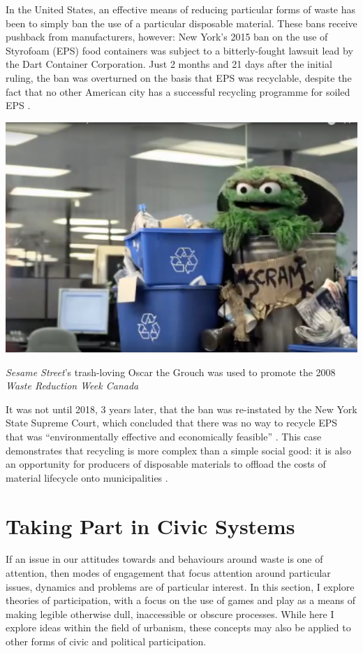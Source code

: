\documentclass[nofonts,nols,justified,nobib]{tufte-book}
\begin{document}
In the United States, an effective means of reducing particular forms of waste has been to simply ban the use of a particular disposable material. These bans receive pushback from manufacturers, however: New York's 2015 ban on the use of Styrofoam (EPS) food containers was subject to a bitterly-fought lawsuit lead by the Dart Container Corporation. Just 2 months and 21 days after the initial ruling, the ban was overturned on the basis that EPS was recyclable, despite the fact that no other American city has a successful recycling programme for soiled EPS \cite{liboiron_power_2015}. 
\begin{marginfigure}
\includegraphics[width=\textwidth]{img/1/oscar-recycle.png}
\caption{\emph{Sesame Street}'s trash-loving Oscar the Grouch was used to promote the 2008 \emph{Waste Reduction Week Canada} \cite{darryl_dinn_recycling_2008}}
\end{marginfigure}
It was not until 2018, 3 years later, that the ban was re-instated by the New York State Supreme Court, which concluded that there was no way to recycle EPS that was ``environmentally effective and economically feasible'' \cite{goldstein_court_2018}. This case demonstrates that recycling is more complex than a simple social good: it is also an opportunity for producers of disposable materials to offload the costs of material lifecycle onto municipalities \cite{macbride_recycling_2011}.


\newpage

\section*{Taking Part in Civic Systems}
If an issue in our attitudes towards and behaviours around waste is one of attention, then modes of engagement that focus attention around particular issues, dynamics and problems are of particular interest. In this section, I explore theories of participation, with a focus on the use of games and play as a means of making legible otherwise dull, inaccessible or obscure processes. While here I explore ideas within the field of urbanism, these concepts may also be applied to other forms of civic and political participation.
\end{document}
